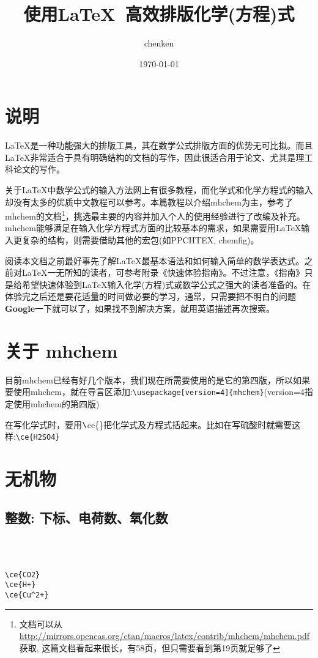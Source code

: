 \documentclass[UTF8, a4paper]{article}
\title{使用\LaTeX\ 高效排版化学(方程)式}
\author{chenken}
\date{\today}
\begin{document}
\maketitle
\tableofcontents

\newpage
\section*{说明}
\LaTeX 是一种功能强大的排版工具，其在数学公式排版方面的优势无可比拟。而且\LaTeX 非常适合于具有明确结构的文档的写作，因此很适合用于论文、尤其是理工科论文的写作。

关于LaTeX中数学公式的输入方法网上有很多教程，而化学式和化学方程式的输入却没有太多的优质中文教程可以参考。本篇教程以介绍mhchem为主，参考了mhchem的文档\footnote{文档可以从\url{http://mirrors.opencas.org/ctan/macros/latex/contrib/mhchem/mhchem.pdf}获取, 这篇文档看起来很长，有58页，但只需要看到第19页就足够了}，挑选最主要的内容并加入个人的使用经验进行了改编及补充。mhchem能够满足在输入化学方程式方面的比较基本的需求，如果需要用\LaTeX 输入更复杂的结构，则需要借助其他的宏包(如PPCHTEX, chemfig)。

阅读本文档之前最好事先了解\LaTeX 最基本语法和如何输入简单的数学表达式。之前对\LaTeX 一无所知的读者，可参考附录《快速体验指南》。不过注意，《指南》只是给希望快速体验到\LaTeX 输入化学(方程)式或数学公式之强大的读者准备的。在体验完之后还是要花适量的时间做必要的学习，通常，只需要把不明白的问题\textbf{Google}一下就可以了，如果找不到解决方案，就用英语描述再次搜索。

\section{关于 mhchem}
目前mhchem已经有好几个版本，我们现在所需要使用的是它的第四版，所以如果要使用mhchem，就在导言区添加:\verb|\usepackage[version=4]{mhchem}|(version=4指定使用mhchem的第四版)

在写化学式时，要用$\verb|\|$ce\{\}把化学式及方程式括起来。比如在写硫酸时就需要这样:\verb|\ce{H2SO4}|%
\section{无机物}
\subsection{整数: 下标、电荷数、氧化数}
\begin{minipage}{.3\textwidth}
	\\
	\\
\end{minipage}
\begin{minipage}{.7\textwidth}
	\verb|\ce{CO2}|\\
	\verb|\ce{H+}|\\
	\verb|\ce{Cu^2+}|
\end{minipage}
\end{document}
